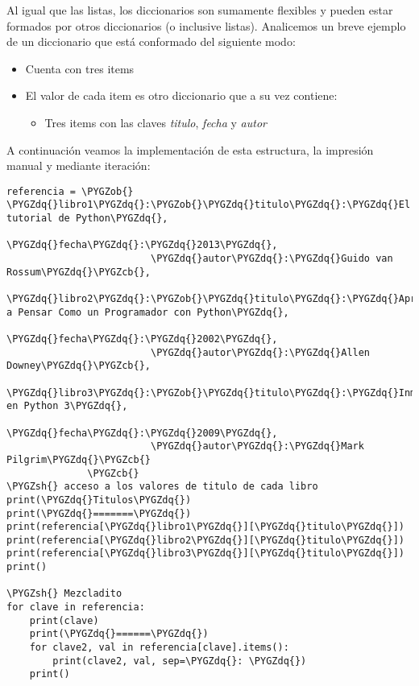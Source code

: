\documentclass[a4paper,12pt,spanish]{sphinxmanual}
\def\PYGZob{\char`\{}
\def\PYGZcb{\char`\}}
\def\PYGZsh{\char`\#}
\def\PYGZdq{\char`\"}
\begin{document}
Al igual que las listas, los diccionarios son sumamente flexibles y
pueden estar formados por otros diccionarios (o inclusive listas).
Analicemos un breve ejemplo de un diccionario que está conformado del
siguiente modo:
\begin{itemize}
\item {} 
Cuenta con tres items

\item {} 
El valor de cada item es otro diccionario que a su vez contiene:
\begin{itemize}
\item {} 
Tres items con las claves \emph{titulo}, \emph{fecha} y \emph{autor}

\end{itemize}

\end{itemize}

A continuación veamos la implementación de esta estructura, la impresión
manual y mediante iteración:

\begin{Verbatim}[commandchars=\\\{\}]
referencia = \PYGZob{} \PYGZdq{}libro1\PYGZdq{}:\PYGZob{}\PYGZdq{}titulo\PYGZdq{}:\PYGZdq{}El tutorial de Python\PYGZdq{},
                         \PYGZdq{}fecha\PYGZdq{}:\PYGZdq{}2013\PYGZdq{},
                         \PYGZdq{}autor\PYGZdq{}:\PYGZdq{}Guido van Rossum\PYGZdq{}\PYGZcb{},
               \PYGZdq{}libro2\PYGZdq{}:\PYGZob{}\PYGZdq{}titulo\PYGZdq{}:\PYGZdq{}Aprenda a Pensar Como un Programador con Python\PYGZdq{},
                         \PYGZdq{}fecha\PYGZdq{}:\PYGZdq{}2002\PYGZdq{},
                         \PYGZdq{}autor\PYGZdq{}:\PYGZdq{}Allen Downey\PYGZdq{}\PYGZcb{},
               \PYGZdq{}libro3\PYGZdq{}:\PYGZob{}\PYGZdq{}titulo\PYGZdq{}:\PYGZdq{}Inmersión en Python 3\PYGZdq{},
                         \PYGZdq{}fecha\PYGZdq{}:\PYGZdq{}2009\PYGZdq{},
                         \PYGZdq{}autor\PYGZdq{}:\PYGZdq{}Mark Pilgrim\PYGZdq{}\PYGZcb{}
              \PYGZcb{}
\PYGZsh{} acceso a los valores de titulo de cada libro
print(\PYGZdq{}Titulos\PYGZdq{})
print(\PYGZdq{}=======\PYGZdq{})
print(referencia[\PYGZdq{}libro1\PYGZdq{}][\PYGZdq{}titulo\PYGZdq{}])
print(referencia[\PYGZdq{}libro2\PYGZdq{}][\PYGZdq{}titulo\PYGZdq{}])
print(referencia[\PYGZdq{}libro3\PYGZdq{}][\PYGZdq{}titulo\PYGZdq{}])
print()

\PYGZsh{} Mezcladito
for clave in referencia:
    print(clave)
    print(\PYGZdq{}======\PYGZdq{})
    for clave2, val in referencia[clave].items():
        print(clave2, val, sep=\PYGZdq{}: \PYGZdq{})
    print()
\end{Verbatim}
\end{document}
